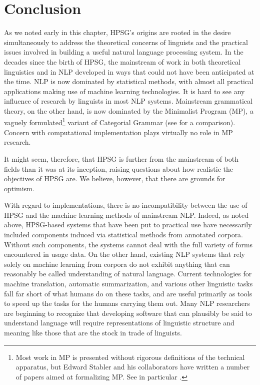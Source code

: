 \documentclass[output=paper]{langsci/langscibook}
\begin{document}
\section{Conclusion}

As we noted early in this chapter, HPSG's origins are rooted in the desire simultaneously to address the theoretical concerns of linguists and the practical issues involved in building a useful natural language processing system.  In the decades since the birth of HPSG, the mainstream of work in both theoretical linguistics and in NLP developed in ways that could not have been anticipated at the time.  NLP is now dominated by statistical methods, with almost all practical applications making use of machine learning technologies.  It is hard to see any influence of research by linguists in most NLP systems.  Mainstream grammatical theory, on the other hand, is now dominated by the Minimalist Program (MP), a vaguely formulated\footnote{Most work in MP is presented without rigorous definitions of the technical apparatus, but Edward Stabler and his collaborators have written a number of papers aimed at formalizing MP.  See in particular \citet{CollStab2016}.} variant of Categorial Grammar (see \citet{RetStab2004} for a comparison).  Concern with computational implementation plays virtually no role in MP research.  

It might seem, therefore, that HPSG is further from the mainstream of both fields than it was at its inception, raising questions about how realistic the objectives of HPSG are.  We believe, however, that there are grounds for optimism.

With regard to implementations, there is no incompatibility between the use of HPSG and the machine learning methods of mainstream NLP.  Indeed, as noted above, HPSG-based systems that have been put to practical use have necessarily included components induced via statistical methods from annotated corpora.  Without such components, the systems cannot deal with the full variety of forms encountered in usage data.  On the other hand, existing NLP systems that rely solely on machine learning from corpora do not exhibit anything that can reasonably be called understanding of natural language.  Current technologies for machine translation, automatic summarization, and various other linguistic tasks fall far short of what humans do on these tasks, and are useful primarily as tools to speed up the tasks for the humans carrying them out.  Many NLP researchers are beginning to recognize that developing software that can plausibly be said to understand language will require representations of linguistic structure and meaning like those that are the stock in trade of linguists.
\end{document}
